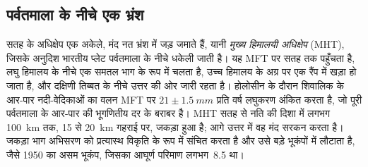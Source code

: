 \subsection{पर्वतमाला के नीचे एक भ्रंश}

सतह के अधिक्षेप एक अकेले, मंद नत भ्रंश में जड़ जमाते हैं, यानी \emph{मुख्य
हिमालयी अधिक्षेप} (MHT), जिसके अनुदिश भारतीय प्लेट पर्वतमाला के नीचे धकेली जाती है। यह
MFT पर सतह तक पहुँचता है, लघु हिमालय के नीचे एक समतल भाग के रूप में चलता है, उच्च हिमालय के अग्र पर
एक रैंप में खड़ा हो जाता है, और दक्षिणी तिब्बत के नीचे उत्तर की ओर जारी रहता है। होलोसीन के दौरान
शिवालिक के आर-पार नदी-वेदिकाओं का वलन MFT पर $21 \pm \qty{1.5}{mm}$ प्रति वर्ष
लघुकरण अंकित करता है, जो पूरी पर्वतमाला के आर-पार की भूगणितीय दर के बराबर है। MHT
सतह से नति की दिशा में लगभग \qty{100}{km} तक, 15 से \qty{20}{km} गहराई पर, जकड़ा हुआ है; आगे
उत्तर में वह मंद सरकन करता है। जकड़ा भाग अभिसरण को प्रत्यास्थ विकृति के रूप में संचित करता है और उसे
बड़े भूकंपों में लौटाता है, जैसे 1950 का असम भूकंप, जिसका आघूर्ण परिमाण लगभग~8.5 था।

